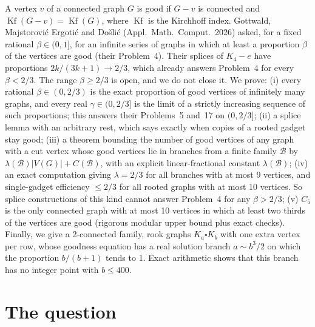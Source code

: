 \documentclass[11pt,a4paper]{report}
\newcommand*{\Kf}{\operatorname{Kf}}
\newcommand*{\cB}{\mathcal{B}}
\begin{document}
\makepapertitle

\begin{paperabstract}
A vertex \(v\) of a connected graph \(G\) is good if \(G-v\) is connected and \(\Kf(G-v)=\Kf(G)\), where \(\Kf\) is the
Kirchhoff index. Gottwald, Majstorović Ergotić and Došlić (Appl.\ Math.\ Comput.\ 2026) asked, for a fixed rational
\(\beta\in(0,1]\), for an infinite series of graphs in which at least a proportion \(\beta\) of the vertices are good
(their Problem~4). Their splices of \(K_4-e\) have proportions \(2k/(3k+1)\to2/3\), which already answers Problem~4 for
every \(\beta<2/3\). The range \(\beta\ge2/3\) is open, and we do not close it. We prove:
(i) every rational \(\beta\in(0,2/3)\) is the exact proportion of good vertices of infinitely many graphs, and every real
\(\gamma\in(0,2/3]\) is the limit of a strictly increasing sequence of such proportions; this answers their Problems~5
and~17 on \((0,2/3]\);
(ii) a splice lemma with an arbitrary rest, which says exactly when copies of a rooted gadget stay good;
(iii) a theorem bounding the number of good vertices of any graph with a cut vertex whose good vertices lie in branches
from a finite family \(\cB\) by \(\lambda(\cB)|V(G)|+C(\cB)\), with an explicit linear-fractional constant
\(\lambda(\cB)\);
(iv) an exact computation giving \(\lambda=2/3\) for all branches with at most 9 vertices, and single-gadget efficiency
\(\le2/3\) for all rooted graphs with at most 10 vertices. So splice constructions of this kind cannot answer Problem~4
for any \(\beta>2/3\);
(v) \(C_5\) is the only connected graph with at most 10 vertices in which at least two thirds of the vertices are good
(rigorous modular upper bound plus exact checks).
Finally, we give a 2-connected family, rook graphs \(K_a\square K_b\) with one extra vertex per row, whose goodness
equation has a real solution branch \(a\sim b^3/2\) on which the proportion \(b/(b+1)\) tends to 1. Exact arithmetic
shows that this branch has no integer point with \(b\le400\).
\end{paperabstract}

\section*{The question}
\end{document}
